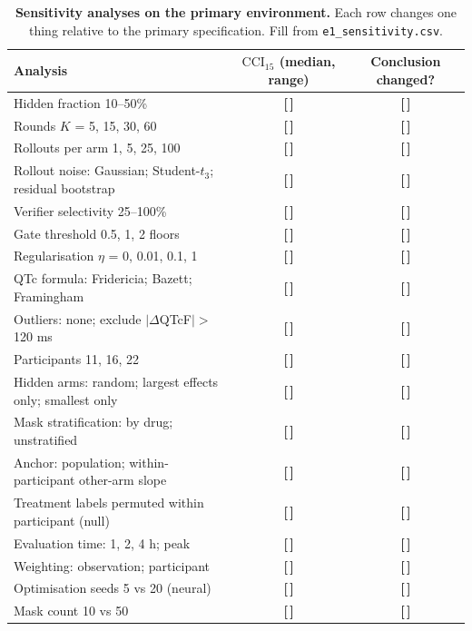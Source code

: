 \documentclass[11pt,a4paper]{article}
\newcommand{\T}{{\color{red}\textbf{[\,]}}}
\newcommand{\CCI}{\mathrm{CCI}}
\begin{document}
\begin{table}[!htbp]\centering\scriptsize
\caption{\textbf{Sensitivity analyses on the primary environment.} Each row changes one thing relative to the primary specification. Fill from \texttt{e1\_sensitivity.csv}.}
\begin{tabularx}{\textwidth}{@{}Y c c@{}}\toprule
Analysis & $\CCI_{15}$ (median, range) & Conclusion changed?\\\midrule
Hidden fraction 10--50\% & \T & \T\\
Rounds $K$ = 5, 15, 30, 60 & \T & \T\\
Rollouts per arm 1, 5, 25, 100 & \T & \T\\
Rollout noise: Gaussian; Student-$t_3$; residual bootstrap & \T & \T\\
Verifier selectivity 25--100\% & \T & \T\\
Gate threshold 0.5, 1, 2 floors & \T & \T\\
Regularisation $\eta$ = 0, 0.01, 0.1, 1 & \T & \T\\
QTc formula: Fridericia; Bazett; Framingham & \T & \T\\
Outliers: none; exclude $|\Delta$QTcF$|>$120 ms & \T & \T\\
Participants 11, 16, 22 & \T & \T\\
Hidden arms: random; largest effects only; smallest only & \T & \T\\
Mask stratification: by drug; unstratified & \T & \T\\
Anchor: population; within-participant other-arm slope & \T & \T\\
Treatment labels permuted within participant (null) & \T & \T\\
Evaluation time: 1, 2, 4 h; peak & \T & \T\\
Weighting: observation; participant & \T & \T\\
Optimisation seeds 5 vs 20 (neural) & \T & \T\\
Mask count 10 vs 50 & \T & \T\\
\bottomrule\end{tabularx}
\end{table}
\FloatBarrier
\end{document}
